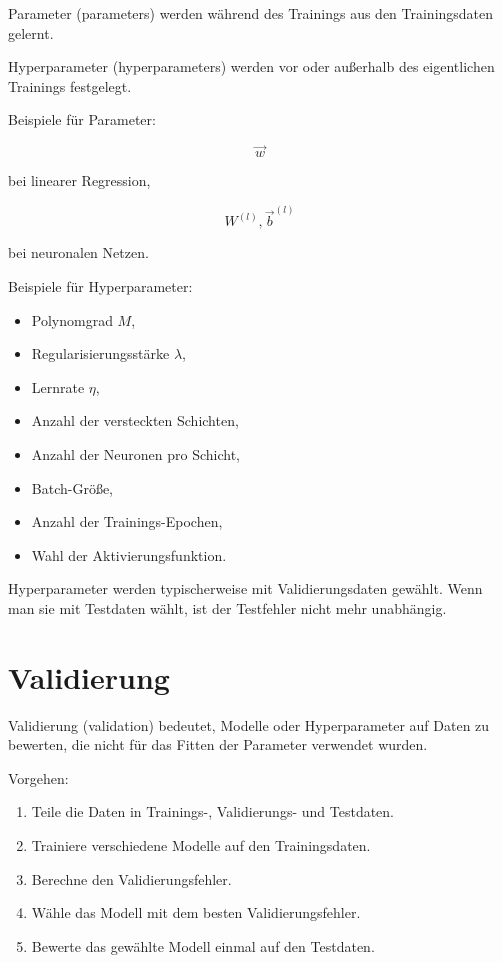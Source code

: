 \begin{definitionbox}
Parameter (parameters) werden während des Trainings aus den Trainingsdaten gelernt.

Hyperparameter (hyperparameters) werden vor oder außerhalb des eigentlichen Trainings festgelegt.
\end{definitionbox}

Beispiele für Parameter:

\[
    \vec{w}
\]

bei linearer Regression,

\[
    W^{(l)},\vec{b}^{(l)}
\]

bei neuronalen Netzen.

Beispiele für Hyperparameter:

\begin{itemize}
    \item Polynomgrad \(M\),
    \item Regularisierungsstärke \(\lambda\),
    \item Lernrate \(\eta\),
    \item Anzahl der versteckten Schichten,
    \item Anzahl der Neuronen pro Schicht,
    \item Batch-Größe,
    \item Anzahl der Trainings-Epochen,
    \item Wahl der Aktivierungsfunktion.
\end{itemize}

\begin{notebox}
Hyperparameter werden typischerweise mit Validierungsdaten gewählt.
Wenn man sie mit Testdaten wählt, ist der Testfehler nicht mehr unabhängig.
\end{notebox}

\section{Validierung}

Validierung (validation) bedeutet, Modelle oder Hyperparameter auf Daten zu bewerten, die nicht für das Fitten der Parameter verwendet wurden.

Vorgehen:

\begin{enumerate}
    \item Teile die Daten in Trainings-, Validierungs- und Testdaten.
    \item Trainiere verschiedene Modelle auf den Trainingsdaten.
    \item Berechne den Validierungsfehler.
    \item Wähle das Modell mit dem besten Validierungsfehler.
    \item Bewerte das gewählte Modell einmal auf den Testdaten.
\end{enumerate}

